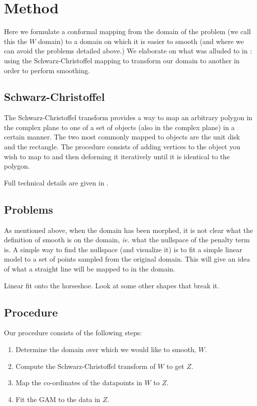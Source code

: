 \documentclass[a4paper,10pt]{amsart}
\newcommand{\sch}{Schwarz-Christoffel }
\begin{document}
\section{Method}

Here we formulate a conformal mapping from the domain of the problem (we call this the $W$ domain) to a domain on which it is easier to smooth (and where we can avoid the problems detailed above.) We elaborate on what was alluded to in \cite{eilerstalk}: using the \sch mapping to transform our domain to another in order to perform smoothing.

\subsection{\sch}

The \sch transform provides a way to map an arbitrary polygon in the complex plane to one of a set of objects (also in the complex plane) in a certain manner. The two most commonly mapped to objects are the unit disk and the rectangle. The procedure consists of adding vertices to the object you wish to map to and then deforming it iteratively until it is identical to the polygon.

Full technical details are given in \cite{miller08}.


\subsection{Problems}

As mentioned above, when the domain has been morphed, it is not clear what the definition of smooth is on the domain, \emph{ie.} what the nullspace of the penalty term is. A simple way to find the nullspace (and visualize it) is to fit a simple linear model to a set of points sampled from the original domain. This will give an idea of what a straight line will be mapped to in the domain.


Linear fit onto the horseshoe.
Look at some other shapes that break it.



\subsection{Procedure}

Our procedure consists of the following steps:

\begin{enumerate}
\item Determine the domain over which we would like to smooth, $W$.

\item Compute the \sch transform of $W$ to get $Z$.

\item Map the co-ordinates of the datapoints in $W$ to $Z$.

\item Fit the GAM to the data in $Z$.

\end{enumerate}
\end{document}
